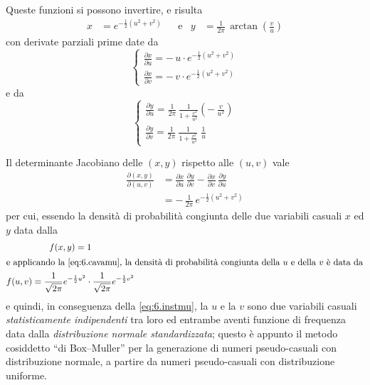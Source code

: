 Queste funzioni si possono invertire, e risulta
\begin{align*}
  x &= e^{- \frac{1}{2} \left( u^2 + v^2
  \right)} &&\text{e} & y &= \frac{1}{2 \pi} \, \arctan
  \left( \frac{v}{u} \right)
\end{align*}
con derivate parziali prime date da
\begin{equation*}
  \begin{cases}
    \displaystyle \frac{\partial x}{\partial u} = - \,
      u \cdot e^{- \frac{1}{2} \left( u^2 + v^2
      \right)} \\[2.5ex]
    \displaystyle \frac{\partial x}{\partial v} = - \,
      v \cdot e^{- \frac{1}{2} \left( u^2 + v^2
      \right)}
  \end{cases}
\end{equation*}
e da
\begin{equation*}
  \begin{cases}
    \displaystyle \frac{\partial y}{\partial u} =
      \frac{1}{2 \pi} \: \frac{1}{1 + \frac{v^2}{u^2}}
      \left( - \, \frac{v}{u^2} \right) \\[3ex]
    \displaystyle \frac{\partial y}{\partial v} =
      \frac{1}{2 \pi} \: \frac{1}{1 + \frac{v^2}{u^2}}
      \; \frac{1}{u}
  \end{cases}
\end{equation*}

Il determinante Jacobiano%
delle $(x,y)$ rispetto alle $(u,v)$ vale
\begin{align*}
  \frac{\partial (x, y)}{\partial (u, v)} & =
    \frac{\partial x}{\partial u} \, \frac{\partial
    y}{\partial v} - \frac{\partial x}{\partial v} \,
    \frac{\partial y}{\partial u} \\[1ex]
  &= - \, \frac{1}{2\pi} \, e^{- \frac{1}{2}
    \left( u^2 + v^2 \right)}
\end{align*}
per cui, essendo la densit\`a di probabilit\`a congiunta
delle due variabili casuali $x$ ed $y$ data dalla
\begin{gather*}
  f(x,y) = 1 \\
  \intertext{e applicando la \eqref{eq:6.cavamu}, la
    densit\`a di probabilit\`a congiunta della $u$ e
    della $v$ \`e data da}
  f(u,v) = \frac{1}{\sqrt{2\pi}}
    e^{- \frac{1}{2} u^2} \cdot
    \frac{1}{\sqrt{2\pi}} e^{- \frac{1}{2}
    v^2}
\end{gather*}
e quindi, in conseguenza della \eqref{eq:6.instmu}, la $u$ e
la $v$ sono due variabili casuali \emph{statisticamente
  indipendenti} tra loro ed entrambe aventi funzione di
frequenza data dalla \emph{distribuzione normale
  standardizzata}; questo \`e appunto il metodo cosiddetto
``di Box--Muller'' per la generazione di numeri
pseudo-casuali con distribuzione normale, a partire da
numeri pseudo-casuali con distribuzione uniforme.

